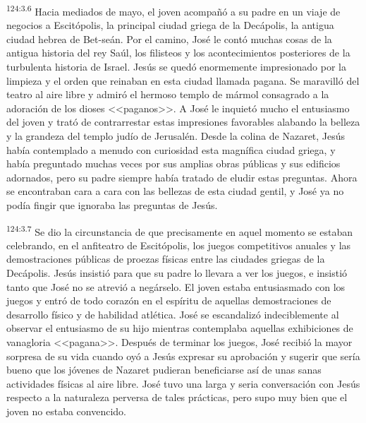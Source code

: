 \par 
\textsuperscript{124:3.6} Hacia mediados de mayo, el joven acompañó a su padre en un viaje de negocios a Escitópolis, la principal ciudad griega de la Decápolis, la antigua ciudad hebrea de Bet-seán. Por el camino, José le contó muchas cosas de la antigua historia del rey Saúl, los filisteos y los acontecimientos posteriores de la turbulenta historia de Israel. Jesús se quedó enormemente impresionado por la limpieza y el orden que reinaban en esta ciudad llamada pagana. Se maravilló del teatro al aire libre y admiró el hermoso templo de mármol consagrado a la adoración de los dioses <<paganos>>. A José le inquietó mucho el entusiasmo del joven y trató de contrarrestar estas impresiones favorables alabando la belleza y la grandeza del templo judío de Jerusalén. Desde la colina de Nazaret, Jesús había contemplado a menudo con curiosidad esta magnífica ciudad griega, y había preguntado muchas veces por sus amplias obras públicas y sus edificios adornados, pero su padre siempre había tratado de eludir estas preguntas. Ahora se encontraban cara a cara con las bellezas de esta ciudad gentil, y José ya no podía fingir que ignoraba las preguntas de Jesús.

\par 
\textsuperscript{124:3.7} Se dio la circunstancia de que precisamente en aquel momento se estaban celebrando, en el anfiteatro de Escitópolis, los juegos competitivos anuales y las demostraciones públicas de proezas físicas entre las ciudades griegas de la Decápolis. Jesús insistió para que su padre lo llevara a ver los juegos, e insistió tanto que José no se atrevió a negárselo. El joven estaba entusiasmado con los juegos y entró de todo corazón en el espíritu de aquellas demostraciones de desarrollo físico y de habilidad atlética. José se escandalizó indeciblemente al observar el entusiasmo de su hijo mientras contemplaba aquellas exhibiciones de vanagloria <<pagana>>. Después de terminar los juegos, José recibió la mayor sorpresa de su vida cuando oyó a Jesús expresar su aprobación y sugerir que sería bueno que los jóvenes de Nazaret pudieran beneficiarse así de unas sanas actividades físicas al aire libre. José tuvo una larga y seria conversación con Jesús respecto a la naturaleza perversa de tales prácticas, pero supo muy bien que el joven no estaba convencido.


